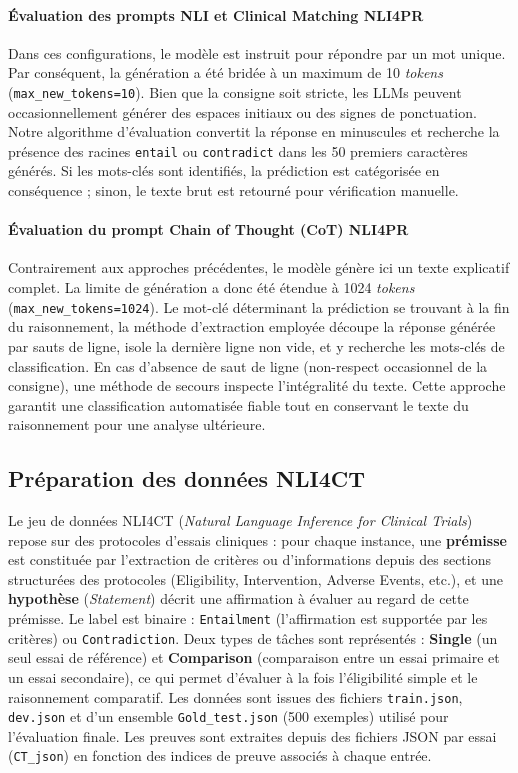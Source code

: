 \documentclass[10pt,twoside]{article}
\begin{document}
\paragraph{Évaluation des prompts NLI et Clinical Matching NLI4PR}
Dans ces configurations, le modèle est instruit pour répondre par un mot unique. Par conséquent, la génération a été bridée à un maximum de 10 \textit{tokens} (\texttt{max\_new\_tokens=10}). Bien que la consigne soit stricte, les LLMs peuvent occasionnellement générer des espaces initiaux ou des signes de ponctuation. Notre algorithme d'évaluation convertit la réponse en minuscules et recherche la présence des racines \texttt{entail} ou \texttt{contradict} dans les 50 premiers caractères générés. Si les mots-clés sont identifiés, la prédiction est catégorisée en conséquence ; sinon, le texte brut est retourné pour vérification manuelle.

\paragraph{Évaluation du prompt Chain of Thought (CoT) NLI4PR}
Contrairement aux approches précédentes, le modèle génère ici un texte explicatif complet. La limite de génération a donc été étendue à 1024 \textit{tokens} (\texttt{max\_new\_tokens=1024}). Le mot-clé déterminant la prédiction se trouvant à la fin du raisonnement, la méthode d'extraction employée découpe la réponse générée par sauts de ligne, isole la dernière ligne non vide, et y recherche les mots-clés de classification. En cas d'absence de saut de ligne (non-respect occasionnel de la consigne), une méthode de secours inspecte l'intégralité du texte. Cette approche garantit une classification automatisée fiable tout en conservant le texte du raisonnement pour une analyse ultérieure.

\subsection{Préparation des données NLI4CT}
Le jeu de données NLI4CT (\textit{Natural Language Inference for Clinical Trials}) repose sur des protocoles d'essais cliniques : pour chaque instance, une \textbf{prémisse} est constituée par l'extraction de critères ou d'informations depuis des sections structurées des protocoles (Eligibility, Intervention, Adverse Events, etc.), et une \textbf{hypothèse} (\textit{Statement}) décrit une affirmation à évaluer au regard de cette prémisse. Le label est binaire : \texttt{Entailment} (l'affirmation est supportée par les critères) ou \texttt{Contradiction}. Deux types de tâches sont représentés : \textbf{Single} (un seul essai de référence) et \textbf{Comparison} (comparaison entre un essai primaire et un essai secondaire), ce qui permet d'évaluer à la fois l'éligibilité simple et le raisonnement comparatif. Les données sont issues des fichiers \texttt{train.json}, \texttt{dev.json} et d'un ensemble \texttt{Gold\_test.json} (500 exemples) utilisé pour l'évaluation finale. Les preuves sont extraites depuis des fichiers JSON par essai (\texttt{CT\_json}) en fonction des indices de preuve associés à chaque entrée.
\end{document}
